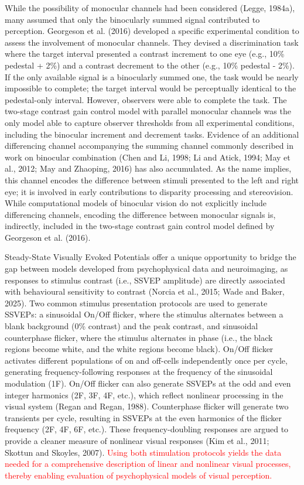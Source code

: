 \documentclass[review,
  12pt,
]{elsarticle}
\begin{document}
While the possibility of monocular channels had been considered (Legge,
1984a), many assumed that only the binocularly summed signal contributed
to perception. Georgeson et al. (2016) developed a specific experimental
condition to assess the involvement of monocular channels. They devised
a discrimination task where the target interval presented a contrast
increment to one eye (e.g., 10\% pedestal + 2\%) and a contrast
decrement to the other (e.g., 10\% pedestal - 2\%). If the only
available signal is a binocularly summed one, the task would be nearly
impossible to complete; the target interval would be perceptually
identical to the pedestal-only interval. However, observers were able to
complete the task. The two-stage contrast gain control model with
parallel monocular channels was the only model able to capture observer
thresholds from all experimental conditions, including the binocular
increment and decrement tasks. Evidence of an additional differencing
channel accompanying the summing channel commonly described in work on
binocular combination (Chen and Li, 1998; Li and Atick, 1994; May et
al., 2012; May and Zhaoping, 2016) has also accumulated. As the name
implies, this channel encodes the difference between stimuli presented
to the left and right eye; it is involved in early contributions to
disparity processing and stereovision. While computational models of
binocular vision do not explicitly include differencing channels,
encoding the difference between monocular signals is, indirectly,
included in the two-stage contrast gain control model defined by
Georgeson et al. (2016).

Steady-State Visually Evoked Potentials offer a unique opportunity to
bridge the gap between models developed from psychophysical data and
neuroimaging, as responses to stimulus contrast (i.e., SSVEP amplitude)
are directly associated with behavioural sensitivity to contrast (Norcia
et al., 2015; Wade and Baker, 2025). Two common stimulus presentation
protocols are used to generate SSVEPs: a sinusoidal On/Off flicker,
where the stimulus alternates between a blank background (0\% contrast)
and the peak contrast, and sinusoidal counterphase flicker, where the
stimulus alternates in phase (i.e., the black regions become white, and
the white regions become black). On/Off flicker activates different
populations of on and off-cells independently once per cycle, generating
frequency-following responses at the frequency of the sinusoidal
modulation (1F). On/Off flicker can also generate SSVEPs at the odd and
even integer harmonics (2F, 3F, 4F, etc.), which reflect nonlinear
processing in the visual system (Regan and Regan, 1988). Counterphase
flicker will generate two transients per cycle, resulting in SSVEPs at
the even harmonics of the flicker frequency (2F, 4F, 6F, etc.). These
frequency-doubling responses are argued to provide a cleaner measure of
nonlinear visual responses (Kim et al., 2011; Skottun and Skoyles,
2007). \textcolor{red}{Using both stimulation protocols yields the data needed
for a comprehensive description of linear and nonlinear visual
processes, thereby enabling evaluation of psychophysical models of
visual perception.}
\end{document}
